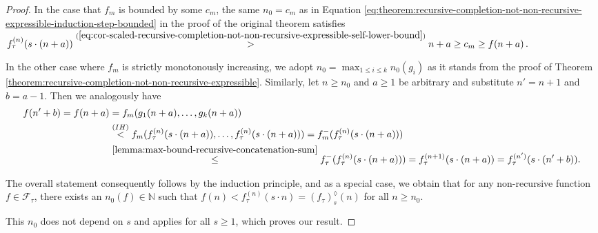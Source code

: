 \begin{proof}
	In the case that $f_m$ is bounded by some $c_m$, the same $n_0=c_m$ as in Equation \ref{eq:theorem:recursive-completion-not-non-recursive-expressible-induction-step-bounded} in the proof of the original theorem satisfies $f_{\tau}^{(n)}(s\cdot (n+a)) \overset{(\ref{eq:cor-scaled-recursive-completion-not-non-recursive-expressible-self-lower-bound})}{>} n+a \geq c_m \geq f(n+a)$.
	
	In the other case where $f_m$ is strictly monotonously increasing, we adopt $n_0=\max_{1\leq i\leq k} n_0(g_i)$ as it stands from the proof of Theorem \ref{theorem:recursive-completion-not-non-recursive-expressible}.
	Similarly, let $n\geq n_0$ and $a\geq 1$ be arbitrary and substitute $n'=n+1$ and $b=a-1$. Then we analogously have
	\begin{align}
		f(n'+b)=f(n+a)&=f_m(g_1(n+a),\dots,g_k(n+a))\\
		&\overset{(IH)}{<}f_m(f_\tau^{(n)}(s\cdot (n+a)),\dots,f_\tau^{(n)}(s\cdot (n+a)))=f_m^{-}(f_\tau^{(n)}(s\cdot (n+a)))\\
		&\overset{\ref{lemma:max-bound-recursive-concatenation-sum}}{\leq} f_\tau^{-}(f_\tau^{(n)}(s\cdot (n+a)))=f_{\tau}^{(n+1)}(s\cdot (n+a))=f_{\tau}^{(n')}(s\cdot(n'+b)).
	\end{align}
	
	The overall statement consequently follows by the induction principle, and as a special case, we obtain that for any non-recursive function $f\in\mathcal{F}_{\tau}$, there exists an $n_0(f)\in\mathbb{N}$ such that $f(n)<f_{\tau}^{(n)}(s\cdot n)=\left(f_{\tau}\right)_{s}^{\lozenge}(n)$ for all $n\geq n_0$.
	
	This $n_0$ does not depend on $s$ and applies for all $s\geq 1$, which proves our result.
	
\end{proof}